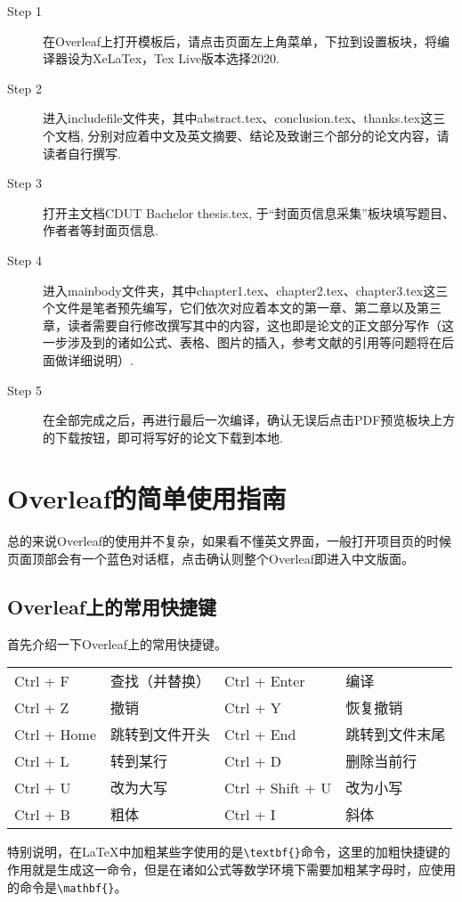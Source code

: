 \begin{description}
  \item[Step 1]  在Overleaf上打开模板后，请点击页面左上角菜单，下拉到设置板块，将编译器设为XeLaTex，Tex Live版本选择2020.
  
  \item[Step 2]  进入includefile文件夹，其中abstract.tex、conclusion.tex、thanks.tex这三个文档,
分别对应着中文及英文摘要、结论及致谢三个部分的论文内容，请读者自行撰写.

  \item[Step 3]  打开主文档CDUT Bachelor thesis.tex, 于“封面页信息采集”板块填写题目、作者者等封面页信息.

  \item[Step 4]  进入mainbody文件夹，其中chapter1.tex、chapter2.tex、chapter3.tex这三个文件是笔者预先编写，它们依次对应着本文的第一章、第二章以及第三章，读者需要自行修改撰写其中的内容，这也即是论文的正文部分写作（这一步涉及到的诸如公式、表格、图片的插入，参考文献的引用等问题将在后面做详细说明）.
  
  \item[Step 5]  在全部完成之后，再进行最后一次编译，确认无误后点击PDF预览板块上方的下载按钮，即可将写好的论文下载到本地.
\end{description}

\section{Overleaf的简单使用指南}

总的来说Overleaf的使用并不复杂，如果看不懂英文界面，一般打开项目页的时候页面顶部会有一个蓝色对话框，点击确认则整个Overleaf即进入中文版面。

\subsection{Overleaf上的常用快捷键}

首先介绍一下Overleaf上的常用快捷键。

\begin{table}[ht]\centering
\begin{tabular}{l l l l}
\hline
Ctrl + F & 查找（并替换）& Ctrl + Enter & 编译 \\
Ctrl + Z & 撤销 & Ctrl + Y & 恢复撤销 \\
Ctrl + Home & 跳转到文件开头 & Ctrl + End & 跳转到文件末尾 \\
Ctrl + L & 转到某行 & Ctrl + D & 删除当前行 \\
Ctrl + U & 改为大写 & Ctrl + Shift + U & 改为小写 \\
Ctrl + B & 粗体 & Ctrl + I & 斜体 \\
\hline
\end{tabular}
\end{table}
特别说明，在LaTeX中加粗某些字使用的是\verb|\textbf{}|命令，这里的加粗快捷键的作用就是生成这一命令，但是在诸如公式等数学环境下需要加粗某字母时，应使用的命令是\verb|\mathbf{}|。

